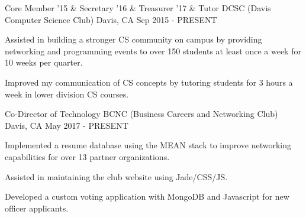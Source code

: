 

\begin{cventries}

  \cventry
    {Core Member '15 \& Secretary '16 \& Treasurer '17 \& Tutor} %
    {DCSC (Davis Computer Science Club)} %
    {Davis, CA} %
    {Sep 2015 - PRESENT} %
    {
      \begin{cvitems} %
        \item {Assisted in building a stronger CS community on campus by providing networking and programming events to over 150 students at least once a week for 10 weeks per quarter.}
        \item {Improved my communication of CS concepts by tutoring students for 3 hours a week in lower division CS courses.}
      \end{cvitems}
    }

  \cventry
    {Co-Director of Technology} %
    {BCNC (Business Careers and Networking Club)} %
    {Davis, CA} %
    {May 2017 - PRESENT} %
    {
      \begin{cvitems} %
        \item {Implemented a resume database using the MEAN stack to improve networking capabilities for over 13 partner organizations.}
        \item {Assisted in maintaining the club website using Jade/CSS/JS.}
        \item {Developed a custom voting application with MongoDB and Javascript for new officer applicants.}
      \end{cvitems}
    }

\end{cventries}
